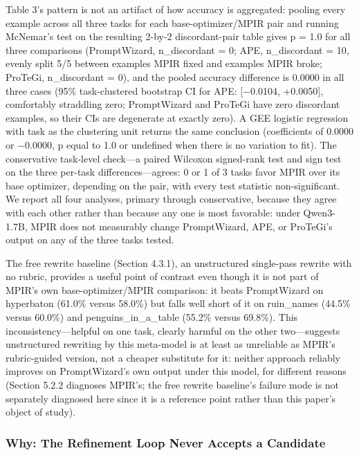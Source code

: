 \documentclass[a4paper,fleqn]{cas-sc}
\begin{document}
Table 3's pattern is not an artifact of how accuracy is aggregated: pooling every example across all three tasks for each base-optimizer/MPIR pair and running McNemar's test on the resulting 2-by-2 discordant-pair table gives p = 1.0 for all three comparisons (PromptWizard, n\_\allowbreak{}discordant = 0; APE, n\_\allowbreak{}discordant = 10, evenly split 5/5 between examples MPIR fixed and examples MPIR broke; ProTeGi, n\_\allowbreak{}discordant = 0), and the pooled accuracy difference is 0.0000 in all three cases (95\% task-clustered bootstrap CI for APE: [$-$0.0104, +0.0050], comfortably straddling zero; PromptWizard and ProTeGi have zero discordant examples, so their CIs are degenerate at exactly zero). A GEE logistic regression with task as the clustering unit returns the same conclusion (coefficients of 0.0000 or $-$0.0000, p equal to 1.0 or undefined when there is no variation to fit). The conservative task-level check---a paired Wilcoxon signed-rank test and sign test on the three per-task differences---agrees: 0 or 1 of 3 tasks favor MPIR over its base optimizer, depending on the pair, with every test statistic non-significant. We report all four analyses, primary through conservative, because they agree with each other rather than because any one is most favorable: under Qwen3-1.7B, MPIR does not measurably change PromptWizard, APE, or ProTeGi's output on any of the three tasks tested.

The free rewrite baseline (Section 4.3.1), an unstructured single-pass rewrite with no rubric, provides a useful point of contrast even though it is not part of MPIR's own base-optimizer/MPIR comparison: it beats PromptWizard on hyperbaton (61.0\% versus 58.0\%) but falls well short of it on ruin\_\allowbreak{}names (44.5\% versus 60.0\%) and penguins\_\allowbreak{}in\_\allowbreak{}a\_\allowbreak{}table (55.2\% versus 69.8\%). This inconsistency---helpful on one task, clearly harmful on the other two---suggests unstructured rewriting by this meta-model is at least as unreliable as MPIR's rubric-guided version, not a cheaper substitute for it: neither approach reliably improves on PromptWizard's own output under this model, for different reasons (Section 5.2.2 diagnoses MPIR's; the free rewrite baseline's failure mode is not separately diagnosed here since it is a reference point rather than this paper's object of study).

\subsubsection{Why: The Refinement Loop Never Accepts a Candidate}
\end{document}
